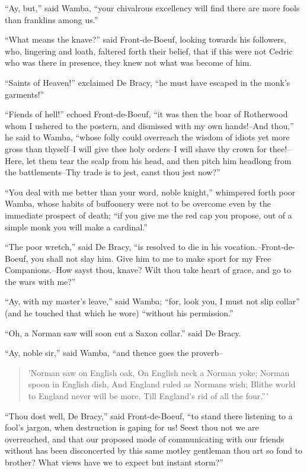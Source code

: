 ``Ay, but,'' said Wamba, ``your chivalrous excellency will find there
are more fools than franklins among us.''

``What means the knave?'' said Front-de-Boeuf, looking towards his
followers, who, lingering and loath, faltered forth their belief, that
if this were not Cedric who was there in presence, they knew not what
was become of him.

``Saints of Heaven!'' exclaimed De Bracy, ``he must have escaped in the
monk's garments!''

``Fiends of hell!'' echoed Front-de-Boeuf, ``it was then the boar of
Rotherwood whom I ushered to the postern, and dismissed with my own
hands!--And thou,'' he said to Wamba, ``whose folly could overreach the
wisdom of idiots yet more gross than thyself--I will give thee holy
orders--I will shave thy crown for thee!--Here, let them tear the scalp
from his head, and then pitch him headlong from the battlements--Thy
trade is to jest, canst thou jest now?''

``You deal with me better than your word, noble knight,'' whimpered
forth poor Wamba, whose habits of buffoonery were not to be overcome
even by the immediate prospect of death; ``if you give me the red cap
you propose, out of a simple monk you will make a cardinal.''

``The poor wretch,'' said De Bracy, ``is resolved to die in his
vocation.--Front-de-Boeuf, you shall not slay him. Give him to me to
make sport for my Free Companions.--How sayst thou, knave? Wilt thou
take heart of grace, and go to the wars with me?''

``Ay, with my master's leave,'' said Wamba; ``for, look you, I must not
slip collar'' (and he touched that which he wore) ``without his
permission.''

``Oh, a Norman saw will soon cut a Saxon collar.'' said De Bracy.

``Ay, noble sir,'' said Wamba, ``and thence goes the proverb--

\begin{quote}
'Norman saw on English oak,
On English neck a Norman yoke;
Norman spoon in English dish,
And England ruled as Normans wish;
Blithe world to England never will be more,
Till England's rid of all the four.'''
\end{quote}

``Thou dost well, De Bracy,'' said Front-de-Boeuf, ``to stand there
listening to a fool's jargon, when destruction is gaping for us! Seest
thou not we are overreached, and that our proposed mode of communicating
with our friends without has been disconcerted by this same motley
gentleman thou art so fond to brother? What views have we to expect but
instant storm?''

